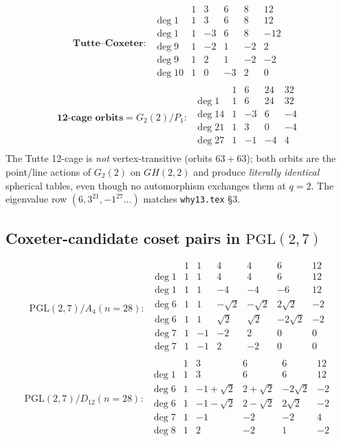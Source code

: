 \documentclass[11pt]{article}
\theoremstyle{remark}
\begin{document}
\[
\textbf{Tutte--Coxeter}:\;
\begin{array}{l|rrrrr}
 & 1 & 3 & 6 & 8 & 12\\
\hline
\deg 1 & 1 & 3 & 6 & 8 & 12\\
\deg 1 & 1 & -3 & 6 & 8 & -12\\
\deg 9 & 1 & -2 & 1 & -2 & 2\\
\deg 9 & 1 & 2 & 1 & -2 & -2\\
\deg 10 & 1 & 0 & -3 & 2 & 0\\
\end{array}
\]
\[
\textbf{12-cage orbits} = \textbf{$G_2(2)/P_1$}:\;
\begin{array}{l|rrrr}
 & 1 & 6 & 24 & 32\\
\hline
\deg 1 & 1 & 6 & 24 & 32\\
\deg 14 & 1 & -3 & 6 & -4\\
\deg 21 & 1 & 3 & 0 & -4\\
\deg 27 & 1 & -1 & -4 & 4\\
\end{array}
\]
The Tutte 12-cage is \emph{not} vertex-transitive (orbits $63+63$);
both orbits are the point/line actions of $G_2(2)$ on $GH(2,2)$ and
produce \emph{literally identical} spherical tables, even though no
automorphism exchanges them at $q=2$. The eigenvalue row
$(6,3^{21},-1^{27}\dots)$ matches \texttt{why13.tex} \S3.

\subsection{Coxeter-candidate coset pairs in $\mathrm{PGL}(2,7)$}

\[
\textbf{$\mathrm{PGL}(2,7)/A_4$} (n=28):\;
\begin{array}{l|rrrrrr}
 & 1 & 1 & 4 & 4 & 6 & 12\\
\hline
\deg 1 & 1 & 1 & 4 & 4 & 6 & 12\\
\deg 1 & 1 & 1 & -4 & -4 & -6 & 12\\
\deg 6 & 1 & 1 & -\sqrt2 & -\sqrt2 & 2\sqrt2 & -2\\
\deg 6 & 1 & 1 & \sqrt2 & \sqrt2 & -2\sqrt2 & -2\\
\deg 7 & 1 & -1 & -2 & 2 & 0 & 0\\
\deg 7 & 1 & -1 & 2 & -2 & 0 & 0\\
\end{array}
\]
\[
\textbf{$\mathrm{PGL}(2,7)/D_{12}$} (n=28):\;
\begin{array}{l|rrrrr}
 & 1 & 3 & 6 & 6 & 12\\
\hline
\deg 1 & 1 & 3 & 6 & 6 & 12\\
\deg 6 & 1 & -1+\sqrt2 & 2+\sqrt2 & -2\sqrt2 & -2\\
\deg 6 & 1 & -1-\sqrt2 & 2-\sqrt2 & 2\sqrt2 & -2\\
\deg 7 & 1 & -1 & -2 & -2 & 4\\
\deg 8 & 1 & 2 & -2 & 1 & -2\\
\end{array}
\]
\end{document}
